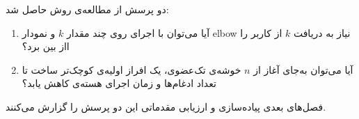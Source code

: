دو پرسش از مطالعه‌ی روش حاصل شد:
\begin{enumerate}
    \item آیا می‌توان با اجرای  روی چند مقدار $k$ و نمودار elbow
          نیاز به دریافت $k$ از کاربر را ااز بین برد؟
    \item آیا می‌توان به‌جای آغاز از $n$ خوشه‌ی تک‌عضوی، یک افراز اولیه‌ی کوچک‌تر
          ساخت تا تعداد ادغام‌ها و زمان اجرای هسته‌ی  کاهش یابد؟
\end{enumerate}
فصل‌های بعدی پیاده‌سازی و ارزیابی مقدماتی این دو پرسش را گزارش می‌کنند.
